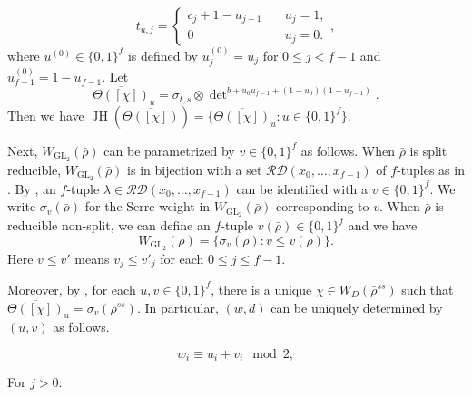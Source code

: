 \documentclass{article}
\numberwithin{equation}{section}
\DeclareMathOperator{\GL}{GL}
\DeclareMathOperator{\JH}{JH}
\newcommand{\cD}{\mathcal{D}}
\newcommand{\cR}{\mathcal{R}}
\begin{document}
\begin{equation}
    t_{u,j}=\begin{cases}
        c_j+1-u_{j-1}\quad & u_j=1,\\
        0\quad & u_j=0.
    \end{cases},
\end{equation}
where $u^{(0)}\in\{0,1\}^f$ is defined by $u^{(0)}_j=u_j$ for $0\leq j<f-1$ and $u^{(0)}_{f-1}=1-u_{f-1}$. Let 
\begin{equation}
    \overline{\Theta([\chi])}_u=\sigma_{t,s}\otimes \det\nolimits^{b+u_0u_{f-1}+(1-u_0)(1-u_{f-1})}.
\end{equation}
Then we have $\JH(\overline{\Theta([\chi])})=\{\overline{\Theta([\chi])}_u: u\in\{0,1\}^f\}$. 

Next, $W_{\GL_2}(\bar{\rho})$ can be parametrized by $v\in \{0,1\}^f$ as follows. 
When $\bar{\rho}$ is split reducible, 
$W_{\GL_2}(\bar{\rho})$ is in bijection with a set $\cR\cD(x_0,\ldots,x_{f-1})$ of $f$-tuples as in \cite[\S~11]{BP12}. 
By \cite[\S~2.4.1]{CW23}, 
an $f$-tuple $\lambda\in \cR\cD(x_0,\ldots,x_{f-1})$ can be identified with a $v\in\{0,1\}^f$. 
We write $\sigma_v(\bar{\rho})$ for the Serre weight in $W_{\GL_2}(\bar{\rho})$ corresponding to $v$. 
When $\bar{\rho}$ is reducible non-split, we can define an $f$-tuple $v(\bar{\rho})\in \{0,1\}^f$ and we have 
$$W_{\GL_2}(\bar{\rho})=\{\sigma_v(\bar{\rho}):v\leq v(\bar{\rho})\}.$$
Here $v\leq v'$ means $v_j\leq v'_j$ for each $0\leq j\leq f-1$. 

Moreover, by \cite[Lemma~3.1]{CW23}, for each $u,v\in\{0,1\}^f$, there is a unique $\chi\in W_D(\bar{\rho}^{ss})$ such that 
$\overline{\Theta([\chi])}_u=\sigma_v(\bar{\rho}^{ss})$. 
In particular, $(w,d)$ can be uniquely determined by $(u,v)$ as follows.

\begin{equation}\label{w_i}
    w_i\equiv u_i+v_i\mod2,
\end{equation}

For $j>0$:
\end{document}
